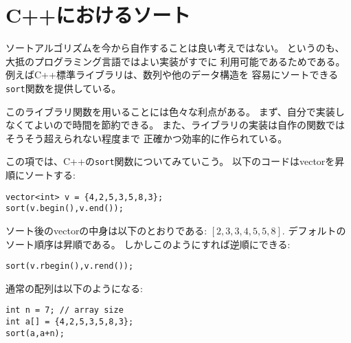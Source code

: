 \section{C++におけるソート}


ソートアルゴリズムを今から自作することは良い考えではない。
というのも、大抵のプログラミング言語ではよい実装がすでに
利用可能であるためである。
例えばC++標準ライブラリは、数列や他のデータ構造を
容易にソートできる\texttt{sort}関数を提供している。

このライブラリ関数を用いることには色々な利点がある。
まず、自分で実装しなくてよいので時間を節約できる。
また、ライブラリの実装は自作の関数ではそうそう超えられない程度まで
正確かつ効率的に作られている。

\begin{comment}
In this section we will see how to use the
C++ \texttt{sort} function.
The following code sorts
a vector in increasing order:
\begin{lstlisting}
vector<int> v = {4,2,5,3,5,8,3};
sort(v.begin(),v.end());
\end{lstlisting}
After the sorting, the contents of the
vector will be
$[2,3,3,4,5,5,8]$.
The default sorting order is increasing,
but a reverse order is possible as follows:
\begin{lstlisting}
sort(v.rbegin(),v.rend());
\end{lstlisting}
An ordinary array can be sorted as follows:
\begin{lstlisting}
int n = 7; // array size
int a[] = {4,2,5,3,5,8,3};
sort(a,a+n);
\end{lstlisting}
\newpage
\end{comment}

この項では、C++の\texttt{sort}関数についてみていこう。
以下のコードはvectorを昇順にソートする:
\begin{lstlisting}
vector<int> v = {4,2,5,3,5,8,3};
sort(v.begin(),v.end());
\end{lstlisting}
ソート後のvectorの中身は以下のとおりである:
$[2,3,3,4,5,5,8]$.
デフォルトのソート順序は昇順である。
しかしこのようにすれば逆順にできる:
\begin{lstlisting}
sort(v.rbegin(),v.rend());
\end{lstlisting}
通常の配列は以下のようになる:
\begin{lstlisting}
int n = 7; // array size
int a[] = {4,2,5,3,5,8,3};
sort(a,a+n);
\end{lstlisting}
\newpage

